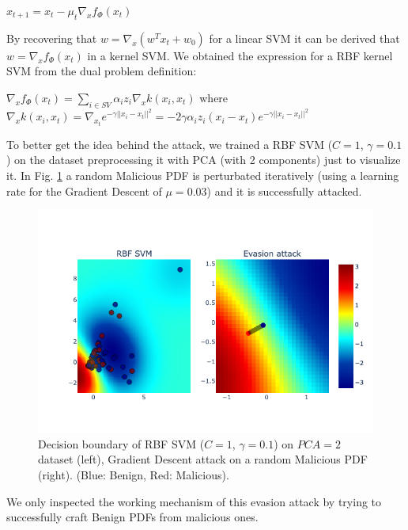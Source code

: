 \documentclass[twocolumn, switch]{article} %
\newcommand\x{0.7}
\begin{document}
\begin{center}
	$x_{t+1} = x_t - \mu_t\nabla_xf_{\Phi}(x_t)$
\end{center}
By recovering that $w = \nabla_x(w^Tx_t+w_0)$ for a linear SVM it can be derived that $w = \nabla_xf_{\Phi}(x_t)$ in a kernel SVM.
We obtained the expression for a RBF kernel SVM from the dual problem definition:
\begin{center}
	$\nabla_xf_{\Phi}(x_t) = \sum_{i \in SV}^{}\alpha_iz_i\nabla_xk(x_i,x_t)$
	where $\nabla_xk(x_i,x_t) = \nabla_{x_t}e^{-\gamma||x_i-x_t||^2}=-2\gamma\alpha_i z_i(x_i - x_t)e^{-\gamma||x_i-x_t||^2}$
\end{center}
To better get the idea behind the attack, we trained a RBF SVM ($C=1$, $\gamma=0.1$) on the dataset preprocessing it with PCA (with 2 components) just to visualize it. In Fig. \ref{fig:svmattack} a random Malicious PDF is perturbated iteratively (using a learning rate for the Gradient Descent of $\mu=0.03$) and it is successfully attacked.
\begin{figure}[ht!]
	\centering
	\includegraphics[width=\x\linewidth]{svmattack.png}
	\caption{Decision boundary of RBF SVM ($C=1$, $\gamma=0.1$) on $PCA=2$ dataset (left), Gradient Descent attack on a random Malicious PDF (right). (Blue: Benign, Red: Malicious).}
	\label{fig:svmattack}
	\vspace{-5mm}
\end{figure}
We only inspected the working mechanism of this evasion attack by trying to successfully craft Benign PDFs from malicious ones.
\end{document}
